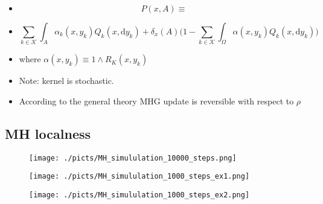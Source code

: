 \begin{frame}
	\begin{itemize}
		\item[] $$P(x,A) \equiv$$
		\item[]	$$ \underset{k \in \mathcal{K}}{\sum} \int_A \alpha_k (x,y_k) Q_k(x, \mathrm{d }y_k) + \delta_x (A) \Big(1 - \underset{k \in \mathcal{K}}{\sum} \int_{\Omega} \alpha(x,y_k) Q_k(x,\mathrm{d }y_k) \Big) $$
	
		\item[] where $\alpha(x,y_k) \equiv 1\wedge R_K (x,y_k)$

		\item[] Note: kernel is stochastic. 
		\item[] According to the general theory MHG update is reversible with respect to $\rho$
	\end{itemize}
\end{frame}

		\subsection{MH localness}

\begin{frame}[plain]

	\begin{center}
		\begin{figure}\texttt{[image: ./picts/MH\_simululation\_10000\_steps.png]}\end{figure}	
	\end{center}	
		
\end{frame}

\begin{frame}[plain]

	\begin{center}
		\begin{figure}\texttt{[image: ./picts/MH\_simululation\_1000\_steps\_ex1.png]}\end{figure}	
	\end{center}	
		
\end{frame}

\begin{frame}[plain]

	\begin{center}
		\begin{figure}\texttt{[image: ./picts/MH\_simululation\_1000\_steps\_ex2.png]}\end{figure}	
	\end{center}	
		
\end{frame}

